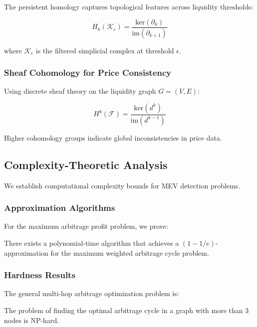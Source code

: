 \documentclass[12pt]{article}
\begin{document}
The persistent homology captures topological features across liquidity thresholds:

\begin{equation}
H_k(\mathcal{K}_\epsilon) = \frac{\text{ker}(\partial_k)}{\text{im}(\partial_{k+1})}
\end{equation}

where $\mathcal{K}_\epsilon$ is the filtered simplicial complex at threshold $\epsilon$.

\subsubsection{Sheaf Cohomology for Price Consistency}

Using discrete sheaf theory on the liquidity graph $G = (V, E)$:

\begin{equation}
H^k(\mathcal{F}) = \frac{\text{ker}(d^k)}{\text{im}(d^{k-1})}
\end{equation}

Higher cohomology groups indicate global inconsistencies in price data.

\subsection{Complexity-Theoretic Analysis}

We establish computational complexity bounds for MEV detection problems.

\subsubsection{Approximation Algorithms}

For the maximum arbitrage profit problem, we prove:

\begin{theorem}
There exists a polynomial-time algorithm that achieves a $(1-1/e)$-approximation for the maximum weighted arbitrage cycle problem.
\end{theorem}

\subsubsection{Hardness Results}

The general multi-hop arbitrage optimization problem is:

\begin{theorem}[NP-Hardness]
The problem of finding the optimal arbitrage cycle in a graph with more than 3 nodes is NP-hard.
\end{theorem}
\end{document}
